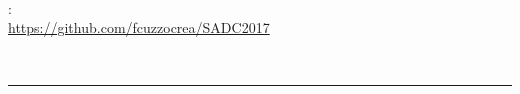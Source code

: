 \thispagestyle{empty}

\hfill
\vspace{5cm}
\strong{ }\\

\vfill

\begin{multicols}{2}
\medskip
{}: \\
\url{https://github.com/fcuzzocrea/SADC2017}


\medskip
\noindent{\sscap{}} \\
\mail{\myEmail}
\vfill
\columnbreak

\end{multicols}
\vspace{1cm}
\hrule
\bigskip
\clearpage
